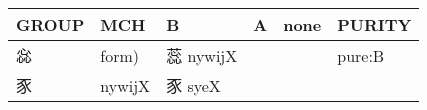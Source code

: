 \documentclass[14pt,a4paper]{scrartcl}
\begin{document}
\begin{longtable}[c]{@{}llllll@{}}
\toprule
\begin{minipage}[b]{0.14\columnwidth}\raggedright\strut
GROUP
\strut\end{minipage} &
\begin{minipage}[b]{0.14\columnwidth}\raggedright\strut
MCH
\strut\end{minipage} &
\begin{minipage}[b]{0.14\columnwidth}\raggedright\strut
B
\strut\end{minipage} &
\begin{minipage}[b]{0.14\columnwidth}\raggedright\strut
A
\strut\end{minipage} &
\begin{minipage}[b]{0.14\columnwidth}\raggedright\strut
none
\strut\end{minipage} &
\begin{minipage}[b]{0.14\columnwidth}\raggedright\strut
PURITY
\strut\end{minipage}\tabularnewline
\midrule
\endhead
\begin{minipage}[t]{0.14\columnwidth}\raggedright\strut
惢
\strut\end{minipage} &
\begin{minipage}[t]{0.14\columnwidth}\raggedright\strut
form)
\strut\end{minipage} &
\begin{minipage}[t]{0.14\columnwidth}\raggedright\strut
蕊 nywijX
\strut\end{minipage} &
\begin{minipage}[t]{0.14\columnwidth}\raggedright\strut
\strut\end{minipage} &
\begin{minipage}[t]{0.14\columnwidth}\raggedright\strut
\strut\end{minipage} &
\begin{minipage}[t]{0.14\columnwidth}\raggedright\strut
pure:B
\strut\end{minipage}\tabularnewline
\begin{minipage}[t]{0.14\columnwidth}\raggedright\strut
豕
\strut\end{minipage} &
\begin{minipage}[t]{0.14\columnwidth}\raggedright\strut
nywijX
\strut\end{minipage} &
\begin{minipage}[t]{0.14\columnwidth}\raggedright\strut
豕 syeX
\strut\end{minipage} &
\begin{minipage}[t]{0.14\columnwidth}\raggedright\strut

\end{minipage}
\end{longtable}
\end{document}
